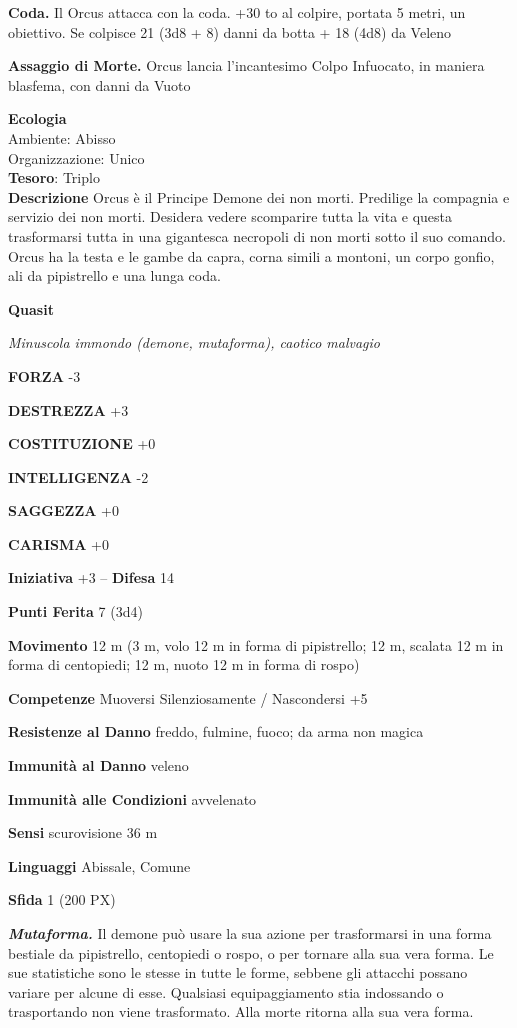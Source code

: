 \begin{multicols}{2}
\textbf{Coda.} Il Orcus attacca con la coda. +30 to al colpire, portata 5 metri, un obiettivo. Se colpisce 21 (3d8 + 8) danni da botta + 18 (4d8) da Veleno

\textbf{Assaggio di Morte.} Orcus lancia l'incantesimo Colpo Infuocato, in maniera blasfema, con danni da Vuoto

\textbf{Ecologia}\\
Ambiente: Abisso\\
Organizzazione: Unico\\
\textbf{Tesoro}: Triplo\\

\textbf{Descrizione}
Orcus è il Principe Demone dei non morti. Predilige la compagnia e servizio dei non morti. Desidera vedere scomparire tutta la vita e questa trasformarsi tutta in una gigantesca necropoli di non morti sotto il suo comando. Orcus ha la testa e le gambe da capra, corna simili a montoni, un corpo gonfio, ali da pipistrello e una lunga coda.


\medskip{}\textbf{Quasit}

\textit{Minuscola immondo (demone, mutaforma), caotico malvagio}

\textbf{FORZA} -3

\textbf{DESTREZZA} +3

\textbf{COSTITUZIONE} +0

\textbf{INTELLIGENZA} -2

\textbf{SAGGEZZA} +0

\textbf{CARISMA} +0

\textbf{Iniziativa} +3 -- \textbf{Difesa} 14

\textbf{Punti Ferita} 7 (3d4)

\textbf{Movimento} 12 m (3 m, volo 12 m in forma di pipistrello; 12 m, scalata 12 m in forma di centopiedi; 12 m, nuoto 12 m in forma di rospo)

\textbf{Competenze} Muoversi Silenziosamente / Nascondersi +5

\textbf{Resistenze al Danno} freddo, fulmine, fuoco; da arma non magica

\textbf{Immunità al Danno} veleno

\textbf{Immunità alle Condizioni}
avvelenato

\textbf{Sensi} scurovisione 36 m

\textbf{Linguaggi} Abissale, Comune

\textbf{Sfida} 1 (200 PX)

\textit{\textbf{Mutaforma.}} Il demone può usare la sua azione per trasformarsi in una forma bestiale da pipistrello, centopiedi o rospo, o per tornare alla sua vera forma. Le sue statistiche sono le stesse in tutte le forme, sebbene gli attacchi possano variare per alcune di esse. Qualsiasi equipaggiamento stia indossando o trasportando non viene trasformato. Alla morte ritorna alla sua vera forma.


\end{multicols}
